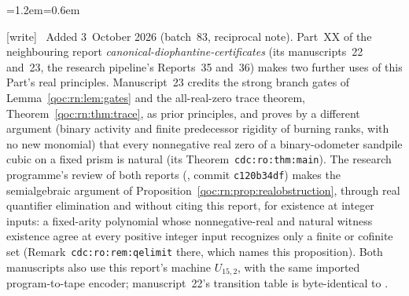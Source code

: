 \documentclass[11pt,letterpaper]{article}
\theoremstyle{definition}
\theoremstyle{remark}
\newcommand{\wtag}{\textup{[write]}}
\newenvironment{writenote}{\par\smallskip\begin{list}{}{\leftmargin=1.2em\rightmargin=0.6em}\item[]\small\wtag\ }{\end{list}\smallskip}
\newcommand{\lab}[1]{\nolinkurl{#1}}
\begin{document}
\begin{writenote}
Added 3~October 2026 (batch~83, reciprocal note). Part~XX of the neighbouring report \emph{canonical-diophantine-certificates} (its manuscripts~22 and~23, the research pipeline's Reports~35 and~36) makes two further uses of this Part's real principles. Manuscript~23 credits the strong branch gates of Lemma~\ref{qoc:rn:lem:gates} and the all-real-zero trace theorem, Theorem~\ref{qoc:rn:thm:trace}, as prior principles, and proves by a different argument (binary activity and finite predecessor rigidity of burning ranks, with no new monomial) that every nonnegative real zero of a binary-odometer sandpile cubic on a fixed prism is natural (its Theorem~\lab{cdc:ro:thm:main}). The research programme's review of both reports (, commit \texttt{c120b34df}) makes the semialgebraic argument of Proposition~\ref{qoc:rn:prop:realobstruction}, through real quantifier elimination and without citing this report, for existence at integer inputs: a fixed-arity polynomial whose nonnegative-real and natural witness existence agree at every positive integer input recognizes only a finite or cofinite set (Remark~\lab{cdc:ro:rem:qelimit} there, which names this proposition). Both manuscripts also use this report's machine $U_{15,2}$, with the same imported program-to-tape encoder; manuscript~22's transition table is byte-identical to .
\end{writenote}
\end{document}
